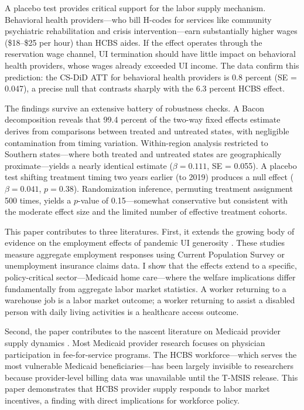 \documentclass[12pt]{article}
\begin{document}
A placebo test provides critical support for the labor supply mechanism. Behavioral health providers---who bill H-codes for services like community psychiatric rehabilitation and crisis intervention---earn substantially higher wages (\$18--\$25 per hour) than HCBS aides. If the effect operates through the reservation wage channel, UI termination should have little impact on behavioral health providers, whose wages already exceeded UI income. The data confirm this prediction: the CS-DiD ATT for behavioral health providers is 0.8 percent (SE = 0.047), a precise null that contrasts sharply with the 6.3 percent HCBS effect.

The findings survive an extensive battery of robustness checks. A Bacon decomposition reveals that 99.4 percent of the two-way fixed effects estimate derives from comparisons between treated and untreated states, with negligible contamination from timing variation. Within-region analysis restricted to Southern states---where both treated and untreated states are geographically proximate---yields a nearly identical estimate ($\beta = 0.111$, SE = 0.055). A placebo test shifting treatment timing two years earlier (to 2019) produces a null effect ($\beta = 0.041$, $p = 0.38$). Randomization inference, permuting treatment assignment 500 times, yields a $p$-value of 0.15---somewhat conservative but consistent with the moderate effect size and the limited number of effective treatment cohorts.

This paper contributes to three literatures. First, it extends the growing body of evidence on the employment effects of pandemic UI generosity \citep{holzer2021, coombs2022, ganong2022, dube2021}. These studies measure aggregate employment responses using Current Population Survey or unemployment insurance claims data. I show that the effects extend to a specific, policy-critical sector---Medicaid home care---where the welfare implications differ fundamentally from aggregate labor market statistics. A worker returning to a warehouse job is a labor market outcome; a worker returning to assist a disabled person with daily living activities is a healthcare access outcome.

Second, the paper contributes to the nascent literature on Medicaid provider supply dynamics \citep{dague2023, zuckerman2021}. Most Medicaid provider research focuses on physician participation in fee-for-service programs. The HCBS workforce---which serves the most vulnerable Medicaid beneficiaries---has been largely invisible to researchers because provider-level billing data was unavailable until the T-MSIS release. This paper demonstrates that HCBS provider supply responds to labor market incentives, a finding with direct implications for workforce policy.
\end{document}
